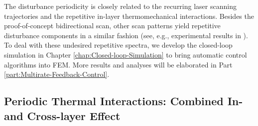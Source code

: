 \documentclass [11pt, proquest] {uwthesis}[2020/02/24]
\begin{document}
The disturbance periodicity is closely related to the recurring laser
scanning trajectories and the repetitive in-layer thermomechanical
interactions. Besides the proof-of-concept bidirectional scan, other scan patterns yield repetitive disturbance components in
a similar fashion (see, e.g., experimental results
in \cite{dunbar2017comparisons}). To deal with these undesired repetitive
spectra, we develop the closed-loop simulation in Chapter \ref{chap:Closed-loop-Simulation}
to bring automatic control algorithms \cite{chen2014new,wang2018multirate}
into FEM. More results and analyses will be elaborated in Part
\ref{part:Multirate-Feedback-Control}.

\subsection{Periodic Thermal Interactions: Combined In- and Cross-layer Effect} \label{subsec:In-and Cross-layer-Effects}
\end{document}
